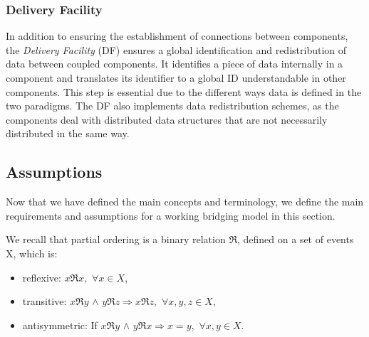 \subsubsection{\deisa Delivery Facility}\label{DF}
In addition to ensuring the establishment of connections between components, the \textit{Delivery Facility} (DF) ensures a global identification and redistribution of data between coupled components. 
It identifies a piece of data internally in a component and translates its identifier to a global ID understandable in other components. This step is essential due to the different ways data is defined in the two paradigms. The DF also implements data redistribution schemes, as the components deal with distributed data structures that are not necessarily distributed in the same way.   





\subsection{Assumptions}
Now that we have defined the main concepts and terminology, we define the main requirements and assumptions for a working bridging model in this section. 

We recall that partial ordering is a binary relation $\Re$, defined on a set of events X, which is:
\begin{itemize}
    \item reflexive: $x\Re x, $  $\forall x \in X$, 
    \item transitive: $x\Re y $ $\wedge$ $ y \Re z \Rightarrow  x \Re z, $  $\forall x, y, z \in X$,
    \item antisymmetric: If $x\Re y$ $\wedge$ $ y \Re x \Rightarrow  x = y, $  $\forall  x, y \in X$.
\end{itemize}

